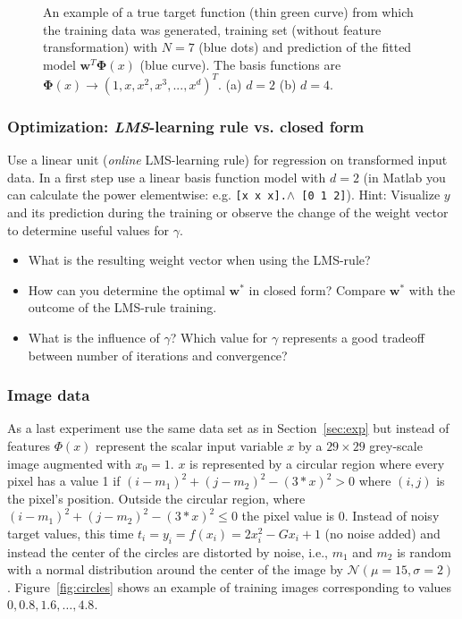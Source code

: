 \documentclass[a4]{article}
\begin{document}
\begin{figure}[!h]
\begin{center}
\centering
\end{center}
\caption{An example of a true target function (thin green curve) from which the training data was generated, training set (without feature transformation) with $N=7$ (blue dots) and prediction of the fitted model ${\mathbf w}^T{\mathbf \Phi}(x)$ (blue curve). The basis functions are ${\mathbf \Phi}(x) \rightarrow (1,x,x^2,x^3,...,x^d)^T$. (a) $d=2$ (b) $d=4$.}
\end{figure}

\subsubsection{Optimization: \emph{LMS}-learning rule vs. closed form}

Use a linear unit (\emph{online} LMS-learning rule) for regression on transformed input data. In a first step use a linear basis function model with $d=2$ (in Matlab you can calculate the power elementwise: e.g. \texttt{[x x x].$\wedge$ [0 1 2]}). Hint: Visualize $y$ and its prediction during the training or observe the change of the weight vector to determine useful values for $\gamma$.
\vspace{2mm}

\begin{itemize}
\item What is the resulting weight vector when using the LMS-rule?
\item How can you determine the optimal ${\mathbf w}^*$ in closed form? Compare ${\mathbf w}^*$ with the outcome of the LMS-rule training.
\item What is the influence of $\gamma$? Which value for $\gamma$ represents a good tradeoff between number of iterations and convergence? 
\end{itemize}

\subsubsection{Image data}

As a last experiment use the same data set as in Section~\ref{sec:exp} but instead of features $\Phi(x)$ represent the scalar input variable $x$ by a $29\times 29$ grey-scale image augmented with $x_0 = 1$. $x$ is represented by a circular region where every pixel has a value 1 if $(i-m_1)^2+(j-m_2)^2-(3*x)^2 > 0$ where $(i,j)$ is the pixel's position. Outside the circular region, where  $(i-m_1)^2+(j-m_2)^2-(3*x)^2 \le 0$ the pixel value is 0.
Instead of noisy target values, this time $t_i = y_i = f(x_i) = 2x_i^2-Gx_i+1$ (no noise added) and instead the center of the circles are distorted by noise, i.e.,  $m_1$ and $m_2$ is random with a normal distribution around the center of the image by $\mathcal{N}(\mu = 15,\sigma = 2)$. Figure~\ref{fig:circles} shows an example of training images corresponding to values $0, 0.8, 1.6,\dots, 4.8$.
\end{document}
